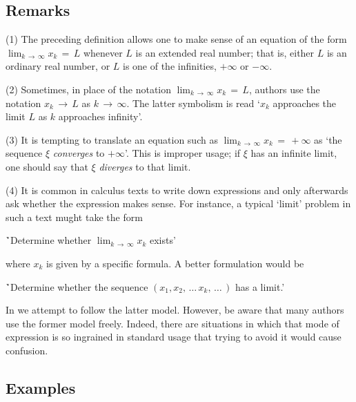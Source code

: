 \V

        \subsection{\small{{\bf Remarks}}}
        \label{RemrkC40.15}

\V

\hspace*{\parindent}(1) The preceding definition allows one to make sense of an equation of the form $\lim_{k \,{\rightarrow}\, {\infty}} x_{k} \,=\, L$
    whenever $L$ is an extended real number;
    that is, either $L$ is an ordinary real number, or $L$ is one of the infinities, $+{\infty}$ or $-{\infty}$.

\V

        (2) Sometimes, in place of the notation $\lim_{k \,{\rightarrow}\, {\infty}} x_{k} \,=\, L$, authors use the notation $x_{k} \,{\rightarrow}\, L$ as $k \,{\rightarrow}\, {\infty}$.
    The latter symbolism is read `$x_{k}$ approaches the limit $L$ as $k$ approaches infinity'.


\V

        (3) It is tempting to translate an equation such as $\lim_{k \,{\rightarrow}\, {\infty}} x_{k} \,=\, +{\infty}$ as `the sequence ${\xi}$ {\em converges} to $+{\infty}$'.
    This is improper usage; if ${\xi}$ has an infinite limit, one should say that ${\xi}$ {\em diverges} to that limit.

\V

        (4) It is common in calculus texts to write down expressions and only afterwards ask whether the expression makes sense.
    For instance, a typical `limit' problem in such a text mught take the form

        \h `Determine whether $\lim_{k \,{\rightarrow}\, {\infty}} x_{k}$ exists'

\noindent where $x_{k}$ is given by a specific formula. A better formulation would be

        \h `Determine whether the sequence $(x_{1},x_{2},\,{\ldots}\,x_{k},\,{\ldots}\,)$ has a limit.'

\noindent In {\ThisText} we attempt to follow the latter model. However,  be aware that many authors use the former model freely.
    Indeed, there are situations in which that mode of expression is so ingrained in standard usage that trying to avoid it would cause confusion.

\V

            \subsection{\small{\bf Examples}}
            \label{ExampC40.20}

